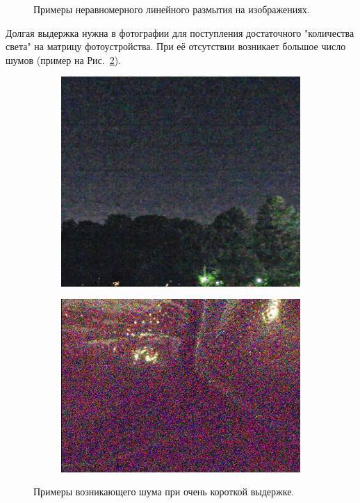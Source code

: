 \begin{figure}[h!]
\begin{subfigure}[b]{0.5\linewidth}
  \end{subfigure}
  \caption{Примеры неравномерного линейного размытия на изображениях.}
  \label{fig:lblur}
\end{figure}

Долгая выдержка нужна в фотографии для поступления достаточного "количества света" на матрицу фотоустройства. При её отсутствии возникает большое число шумов (пример на Рис.~\ref{fig:low_exposure}).

\begin{figure}[h!]
  \centering
  \begin{subfigure}[b]{0.4\linewidth}
    \includegraphics[width=\linewidth]{pics/linear_motion_blur/low_exposure.jpg}
  \end{subfigure}
  \begin{subfigure}[b]{0.4\linewidth}
    \includegraphics[width=\linewidth]{pics/linear_motion_blur/other_low_exp.PNG}
  \end{subfigure}
  \caption{Примеры возникающего шума при очень короткой выдержке.}
  \label{fig:low_exposure}
\end{figure}

